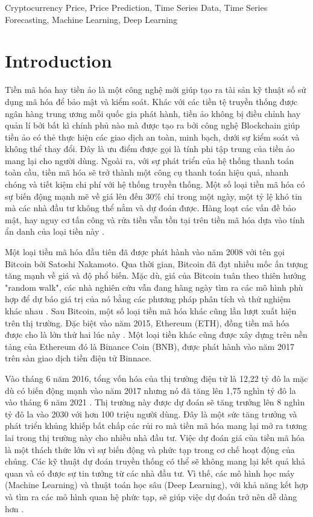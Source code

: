 \documentclass[conference]{IEEEtran}
\begin{document}
\begin{IEEEkeywords}
Cryptocurrency Price, Price Prediction, Time Series Data, Time Series Forecasting, Machine Learning, Deep Learning 
\end{IEEEkeywords}

\section{Introduction}
Tiền mã hóa hay tiền ảo là một công nghệ mới giúp tạo ra tài sản kỹ thuật số sử dụng mã hóa để bảo mật và kiểm soát. Khác với các tiền tệ truyền thống được ngân hàng trung ương mỗi quốc gia phát hành, tiền ảo không bị điều chỉnh hay quản lí bởi bất kì chính phủ nào mà được tạo ra bởi công nghệ Blockchain giúp tiền ảo có thẻ thực hiện các giao dịch an toàn, minh bạch, dưới sự kiểm soát và không thể thay đổi. Đây là ưu điểm được gọi là tính phi tập trung của tiền ảo mang lại cho người dùng. Ngoài ra, với sự phát triển của hệ thống thanh toán toàn cầu, tiền mã hóa sẽ trở thành một công cụ thanh toán hiệu quả, nhanh chóng và tiết kiệm chi phí với hệ thống truyền thống\cite{b1}. Một số loại tiền mã hóa có sự biến động mạnh mẽ về giá lên đến 30\% chỉ trong một ngày, một tỷ lệ khó tin mà các nhà đầu tư không thể nắm và dự đoán được. Hàng loạt các vấn đề bảo mật, hay nguy cơ tấn công và rửa tiền vẫn tồn tại trên tiền mã hóa dựa vào tính ẩn danh của loại tiền này \cite{b2}. 
 
Một loại tiền mã hóa đầu tiên đã được phát hành vào năm 2008 với tên gọi Bitcoin bởi Satoshi Nakamoto\cite{b3}. Qua thời gian, Bitcoin đã đạt nhiều mốc ấn tượng tăng mạnh về giá và độ phổ biến. Mặc dù, giá của Bitcoin tuân theo thiên hướng "random walk", các nhà nghiên cứu vẫn đang hàng ngày tìm ra các mô hình phù hợp để dự báo giá trị của nó bằng các phương pháp phân tích và thử nghiệm khác nhau \cite{b4}. Sau Bitcoin, một số loại tiền mã hóa khác cũng lần lượt xuất hiện trên thị trường. Đặc biệt vào năm 2015, Ethereum (ETH), đồng tiền mã hóa được cho là lớn thứ hai lúc này \cite{b5}. Một loại tiền khác cũng được xây dựng trên nền tảng của Ethereum đó là Binance Coin (BNB), được phát hành vào năm 2017 trên sàn giao dịch tiền điện tử Binnace. 

Vào tháng 6 năm 2016, tổng vốn hóa của thị trường điện tử là 12,22 tỷ đô la mặc dù có biến động mạnh vào năm 2017 nhưng nó đã tăng lên 1,75 nghìn tỷ đô la vào tháng 6 năm 2021 \cite{b6}. Thị trường này được dự đoán sẽ tăng trưởng lên 8 nghìn tỷ đô la vào 2030 với hơn 100 triệu người dùng. Đây là một sức tăng trưởng và phát triển khủng khiếp bất chấp các rủi ro mà tiền mã hóa mang lại mở ra tương lai trong thị trường này cho nhiều nhà đầu tư. Việc dự đoán giá của tiền mã hóa là một thách thức lớn vì sự biến động và phức tạp trong cơ chế hoạt động của chúng. Các kỹ thuật dự đoán truyền thống có thể sẽ không mang lại kết quả khả quan và có được sự tin tưởng từ các nhà đầu tư. Vì thế, các mô hình học máy (Machine Learning) và thuật toán học sâu (Deep Learning), với khả năng kết hợp và tìm ra các mô hình quan hệ phức tạp, sẽ giúp việc dự đoán trở nên dễ dàng hơn \cite{b7}.
\end{document}
